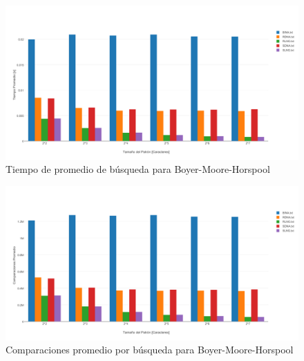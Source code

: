 \documentclass[14pt,letterpaper,hidelinks]{extarticle}
\begin{document}
\newpage
		\begin{figure}[ht!]
			\centering
			\includegraphics[scale=0.5]{img/tBMH.pdf}
			\caption{Tiempo de promedio de búsqueda para Boyer-Moore-Horspool} \label{construccion}
		\end{figure}

		\newpage
		\begin{figure}[ht!]
			\centering
			\includegraphics[scale=0.5]{img/cBMH.pdf}
			\caption{Comparaciones promedio por búsqueda para Boyer-Moore-Horspool} \label{construccion}
		\end{figure}


\newpage
\end{document}
